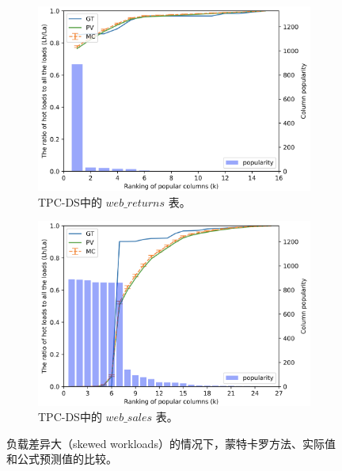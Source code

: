 \begin{figure}[]
\begin{minipage}[t]{0.5\textwidth}
        \begin{subfigure}[t]{1\textwidth}
            \centering
            \includegraphics[width=1\textwidth]{img/cw-cache/emul_web_returns}
            \caption{TPC-DS中的 $web\_returns$ 表。}
            \label{fig:emul-wr}
        \end{subfigure}%
        
        \begin{subfigure}[t]{1\textwidth}
            \centering
            \includegraphics[width=1\textwidth]{img/cw-cache/emul_web_sales}
            \caption{TPC-DS中的 $web\_sales$ 表。}
            \label{fig:emul-ws}
        \end{subfigure}%
        \caption{负载差异大（skewed workloads）的情况下，蒙特卡罗方法、实际值和公式预测值的比较。}
        \label{fig:mc_pv_gt}
    \end{minipage}
\end{figure}


